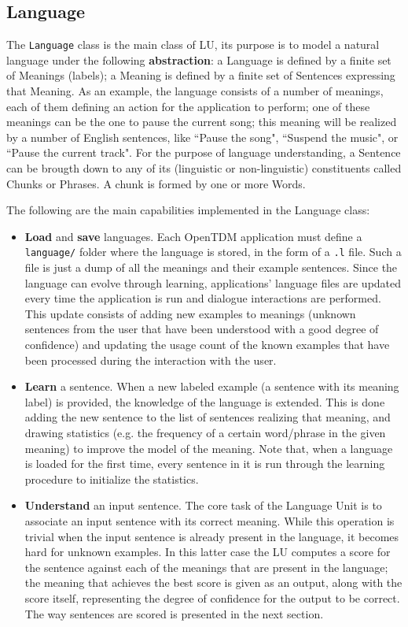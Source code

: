 \subsection{Language}
The \texttt{Language} class is the main class of LU, its purpose is to model a natural language under the following \textbf{abstraction}: a Language is defined by a finite set of Meanings (labels); a Meaning is defined by a finite set of Sentences expressing that Meaning. As an example, the \pname language consists of a number of meanings, each of them defining an action for the application to perform; one of these meanings can be the one to pause the current song; this meaning will be realized by a number of English sentences, like ``Pause the song", ``Suspend the music", or ``Pause the current track". For the purpose of language understanding, a Sentence can be brougth down to any of its (linguistic or non-linguistic) constituents called Chunks or Phrases. A chunk is formed by one or more Words.

The following are the main capabilities implemented in the Language class:
\begin{itemize}
	\item \textbf{Load} and \textbf{save} languages. Each OpenTDM application must define a \texttt{language/} folder where the language is stored, in the form of a \texttt{.l} file. Such a file is just a dump of all the meanings and their example sentences. Since the language  can evolve through learning, applications' language files are updated every time the application is run and dialogue interactions are performed. This update consists of adding new examples to meanings (unknown sentences from the user that have been understood with a good degree of confidence) and updating the usage count of the known examples that have been processed during the interaction with the user.
	\item \textbf{Learn} a sentence. When a new labeled example (a sentence with its meaning label) is provided, the knowledge of the language is extended. This is done adding the new sentence to the list of sentences realizing that meaning, and drawing statistics (e.g. the frequency of a certain word/phrase in the given meaning) to improve the model of the meaning. Note that, when a language is loaded for the first time, every sentence in it is run through the learning procedure to initialize the statistics.
	\item \textbf{Understand} an input sentence. The core task of the Language Unit is to associate an input sentence with its correct meaning. While this operation is trivial when the input sentence is already present in the language, it becomes hard for unknown examples. In this latter case the LU computes a score for the sentence against each of the meanings that are present in the language; the meaning that achieves the best score is given as an output, along with the score itself, representing the degree of confidence for the output to be correct. The way sentences are scored is presented in the next section.
\end{itemize}

